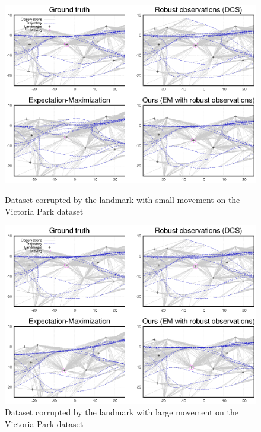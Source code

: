 \begin{figure}[ht]
\centering
\begin{minipage}[b]{0.48\textwidth}
  \includegraphics[width=\textwidth]{fig/small-movement}
  \caption{Dataset corrupted by the landmark with small movement on the Victoria Park dataset}
  \label{fig:small-movement}
\end{minipage}
\quad
\begin{minipage}[b]{0.48\textwidth}
  \includegraphics[width=\textwidth]{fig/large-movement}
  \caption{Dataset corrupted by the landmark with large movement on the Victoria Park dataset}
  \label{fig:large-movement}
\end{minipage}
\end{figure}

